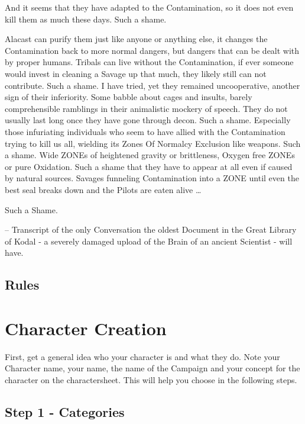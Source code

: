\documentclass{book}
\begin{document}
    And it seems that they have adapted to the Contamination, so it does not even kill them as much these days.
    Such a shame. \par
    Alacast can purify them just like anyone or anything else,
    it changes the Contamination back to more normal dangers, but dangers that can be dealt with by proper humans.
    Tribals can live without the Contamination,
    if ever someone would invest in cleaning a Savage up that much, they likely still can not contribute.
    Such a shame.
    I have tried, yet they remained uncooperative, another sign of their inferiority.
    Some babble about cages and insults, barely comprehensible ramblings in their animalistic mockery of
    speech.
    They do not usually last long once they have gone through decon.
    Such a shame.
    Especially those infuriating individuals who seem to have allied with the Contamination trying to kill us all,
    wielding its Zones Of Normalcy Exclusion like weapons.
    Such a shame.
    Wide ZONEs of heightened gravity or brittleness, Oxygen free ZONEs or pure Oxidation.
    Such a shame that they have to appear at all even if caused by natural sources.
    Savages funneling Contamination into a ZONE  until even the best seal breaks down and the Pilots are eaten alive
    \ldots \par Such a Shame. \par \par
    -- Transcript of the only Conversation the oldest Document in the Great Library of Kodal - a severely damaged
    upload of the Brain of an ancient Scientist - will have.\newpage


    \section{Rules}\label{sec:rules}
    


    \chapter{Character Creation}\label{ch:charactercreation}
    First, get a general idea who your character is and what they do.
    Note your Character name, your name, the name of the
    Campaign and your concept for the character on the charactersheet.
    This will help you choose in the following steps.

    \section{Step 1 - Categories}\label{sec:step1-categories}
\end{document}
